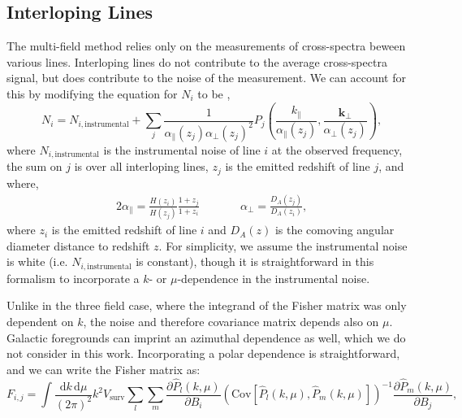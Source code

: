 \documentclass{aastex62}
\newcommand{\beq}{\begin{equation}}
\newcommand{\eeq}{\end{equation}}
\newcommand{\kpar}{k_{\parallel}}
\newcommand{\kperp}{\bm{k}_{\perp}}
\newcommand{\apar}{\alpha_{\parallel}}
\newcommand{\aperp}{\alpha_{\perp}}
\newcommand{\Cov}[2]{\mathrm{Cov}[#1,#2]}
\begin{document}
\subsection{Interloping Lines} \label{ssec:interlopers}
The multi-field method relies only on the measurements of cross-spectra beween
various lines. Interloping lines do not contribute to the average
cross-spectra signal, but does contribute to the noise of the measurement. We
can account for this by modifying the equation for $N_i$ to be
\citep{2016ApJ...825..143L, 2016ApJ...832..165C},
\beq\label{eq:ptot_intlpr}
N_i = N_{i,\text{instrumental}} + \sum_{j} \frac{1}{\apar(z_j) \aperp(z_j)^2} 
            P_j\left(\frac{\kpar}{\apar(z_j)}, 
                     \frac{\kperp}{\aperp(z_j)}\right)\text{,}
\eeq
where $N_{i,\text{instrumental}}$ is the instrumental noise of line $i$ at the
observed frequency, the sum on $j$ is over all interloping lines, $z_j$ is the
emitted redshift of line $j$, and where,
\begin{alignat}{2}
\apar = \frac{H(z_i)}{H(z_j)} \frac{1+z_j}{1+z_i} \quad \quad &&
\aperp = \frac{D_{A}(z_j)}{D_A(z_i)}\text{,}
\end{alignat}
where $z_i$ is the emitted redshift of line $i$ and $D_A(z)$ is the comoving
angular diameter distance to redshift $z$. For simplicity, we assume the
instrumental noise is white (i.e. $N_{i,\text{instrumental}}$ is constant),
though it is straightforward in this formalism to incorporate a $k$- or
$\mu$-dependence in the instrumental noise.

Unlike in the three field case, where the integrand of the Fisher matrix was
only dependent on $k$, the noise and therefore covariance matrix depends also
on $\mu$. Galactic foregrounds can imprint an azimuthal dependence as well,
which we do not consider in this work. Incorporating a polar dependence is straightforward, and we can write the Fisher matrix as:
\beq\label{eq:fisher_mu}
F_{i,j} = 
\int \frac{\text{d}k\,\text{d}\mu}{(2\pi)^2} k^2 V_{\text{surv}}
\sum_{l} \sum_{m}
\frac{\partial \hat{P}_{l}(k, \mu)}{\partial B_i}
\left(\Cov{\hat{P}_{l}(k, \mu)}{\hat{P}_{m}(k, \mu)}\right)^{-1}
\frac{\partial \hat{P}_{m}(k, \mu)}{\partial B_j}\text{,}
\eeq



\end{document}
